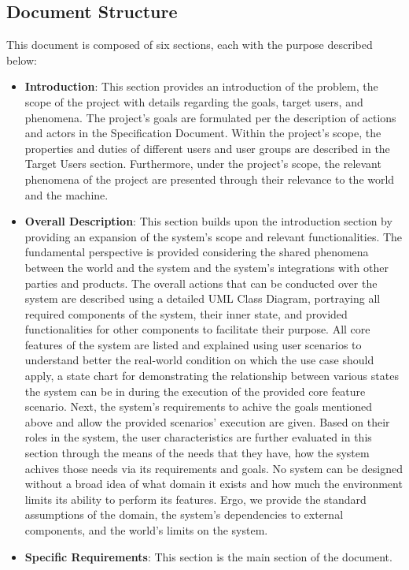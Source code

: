 \subsection{Document Structure}
This document is composed of six sections, each with the purpose described below: \\
\begin{itemize}
    \item \textbf{Introduction}: This section provides an introduction of the problem, the scope of the project with details regarding the goals, target users, and phenomena.
    The project's goals are formulated per the description of actions and actors in the Specification Document.
    Within the project's scope, the properties and duties of different users and user groups are described in the Target Users section.
    Furthermore, under the project's scope, the relevant phenomena of the project are presented through their relevance to the world and the machine.
    \item \textbf{Overall Description}: This section builds upon the introduction section by providing an expansion of the system's scope and relevant functionalities.
    The fundamental perspective is provided considering the shared phenomena between the world and the system and the system's integrations with other parties and products.
    The overall actions that can be conducted over the system are described using a detailed UML Class Diagram, portraying all required components of the system, their inner state, and provided functionalities for other components to facilitate their purpose.
    All core features of the system are listed and explained using user scenarios to understand better the real-world condition on which the use case should apply, a state chart for demonstrating the relationship between various states the system can be in during the execution of the provided core feature scenario.
    Next, the system's requirements to achive the goals mentioned above and allow the provided scenarios' execution are given.
    Based on their roles in the system, the user characteristics are further evaluated in this section through the means of the needs that they have, how the system achives those needs via its requirements and goals.
    No system can be designed without a broad idea of what domain it exists and how much the environment limits its ability to perform its features.
    Ergo, we provide the standard assumptions of the domain, the system's dependencies to external components, and the world's limits on the system.
    \item \textbf{Specific Requirements}: This section is the main section of the document.

\end{itemize}
